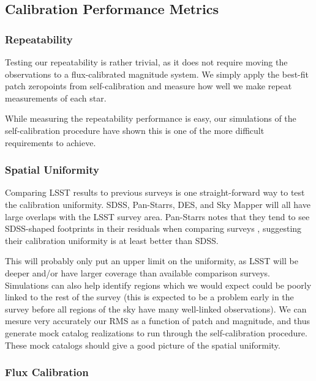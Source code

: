 \documentclass[12pt,preprint]{aastex}
\begin{document}
\subsection{Calibration Performance Metrics}



\subsubsection{Repeatability}


Testing our repeatability is rather trivial, as it does not require
moving the observations to a flux-calibrated magnitude system.  We
simply apply the best-fit patch zeropoints from self-calibration and
measure how well we make repeat measurements of each star.  

While measuring the repeatability performance is easy, our simulations
of the self-calibration procedure have shown this is one of the more
difficult requirements to achieve.  

\subsubsection{Spatial Uniformity}

Comparing LSST results to previous surveys is one straight-forward way
to test the calibration uniformity.  SDSS, Pan-Starrs, DES, and Sky
Mapper will all have large overlaps with the LSST survey area.
Pan-Starrs notes that they tend to see SDSS-shaped footprints in their
residuals when comparing surveys \citep{Schlafly10}, suggesting their
calibration uniformity is at least better than SDSS.

 This will probably only put an upper limit on the uniformity, as
LSST will be deeper and/or have larger coverage than available
comparison surveys.  Simulations can also help identify regions which
we would expect could be poorly linked to the rest of the survey (this
is expected to be a problem early in the survey before all regions of
the sky have many well-linked observations).  We can mesure very
accurately our RMS as a function of patch and magnitude, and thus
generate mock catalog realizations to run through the self-calibration
procedure.  These mock catalogs should give a good picture of the
spatial uniformity.

\subsubsection{Flux Calibration}
\end{document}
